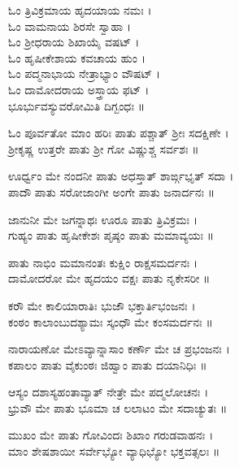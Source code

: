 ಓಂ ತ್ರಿವಿಕ್ರಮಾಯ ಹೃದಯಾಯ ನಮಃ ।\\
ಓಂ ವಾಮನಾಯ ಶಿರಸೇ ಸ್ವಾಹಾ ।\\
ಓಂ ಶ್ರೀಧರಾಯ ಶಿಖಾಯೈ ವಷಟ್ ।\\
ಓಂ ಹೃಷೀಕೇಶಾಯ ಕವಚಾಯ ಹುಂ ।\\
ಓಂ ಪದ್ಮನಾಭಾಯ ನೇತ್ರಾಭ್ಯಾಂ ವೌಷಟ್ ।\\
ಓಂ ದಾಮೋದರಾಯ ಅಸ್ತ್ರಾಯ ಫಟ್ ।\\
ಭೂರ್ಭುವಸ್ಯುವರೋಮಿತಿ ದಿಗ್ಬಂಧಃ ॥


ಓಂ ಪೂರ್ವತೋ ಮಾಂ ಹರಿಃ ಪಾತು ಪಶ್ಚಾತ್ ಶ್ರೀಃ ಸದಕ್ಷಿಣೇ ।\\
ಶ್ರೀಕೃಷ್ಣ ಉತ್ತರೇ ಪಾತು ಶ್ರೀ ಗೋ ವಿಷ್ಣುಶ್ಚ ಸರ್ವಶಃ ॥

ಊರ್ಧ್ವಂ ಮೇ ನಂದನೀ ಪಾತು ಅಧಸ್ತಾತ್ ಶಾರ್ಙ್ಗಭೃತ್ ಸದಾ ।\\
ಪಾದೌ ಪಾತು ಸರೋಜಾಂಗೀ ಅಂಗೇ ಪಾತು ಜನಾರ್ದನಃ ॥

ಜಾನುನೀ ಮೇ ಜಗನ್ನಾಥಃ ಊರೂ ಪಾತು ತ್ರಿವಿಕ್ರಮಃ ।\\
ಗುಹ್ಯಂ ಪಾತು ಹೃಷೀಕೇಶಃ ಪೃಷ್ಠಂ ಪಾತು ಮಮಾವ್ಯಯಃ ॥

ಪಾತು ನಾಭಿಂ ಮಮಾನಂತಃ ಕುಕ್ಷಿಂ ರಾಕ್ಷಸಮರ್ದನಃ ।\\
ದಾಮೋದರೋ ಮೇ ಹೃದಯಂ ವಕ್ಷಃ ಪಾತು ನೃಕೇಸರೀ ॥

ಕರೌ ಮೇ ಕಾಲಿಯಾರಾತಿಃ ಭುಜೌ ಭಕ್ತಾರ್ತಿಭಂಜನಃ ।\\
ಕಂಠಂ ಕಾಲಾಂಬುದಶ್ಯಾಮಃ ಸ್ಕಂಧೌ ಮೇ ಕಂಸಮರ್ದನಃ ॥

ನಾರಾಯಣೋ ಮೇಽವ್ಯಾನ್ನಾಸಾಂ ಕರ್ಣೌ ಮೇ ಚ ಪ್ರಭಂಜನಃ ।\\
ಕಪಾಲಂ ಪಾತು ವೈಕುಂಠಃ ಜಿಹ್ವಾಂ ಪಾತು ದಯಾನಿಧಿಃ ॥

ಆಸ್ಯಂ ದಶಾಸ್ಯಹಂತಾವ್ಯಾತ್ ನೇತ್ರೇ ಮೇ ಪದ್ಮಲೋಚನಃ ।\\
ಭ್ರುವೌ ಮೇ ಪಾತು ಭೂಮಾ ಚ ಲಲಾಟಂ ಮೇ ಸದಾಚ್ಯುತಃ ॥

ಮುಖಂ ಮೇ ಪಾತು ಗೋವಿಂದಃ ಶಿಖಾಂ ಗರುಡವಾಹನಃ ।\\
ಮಾಂ ಶೇಷಶಾಯೀ ಸರ್ವೇಭ್ಯೋ ವ್ಯಾಧಿಭ್ಯೋ ಭಕ್ತವತ್ಸಲಃ ॥

